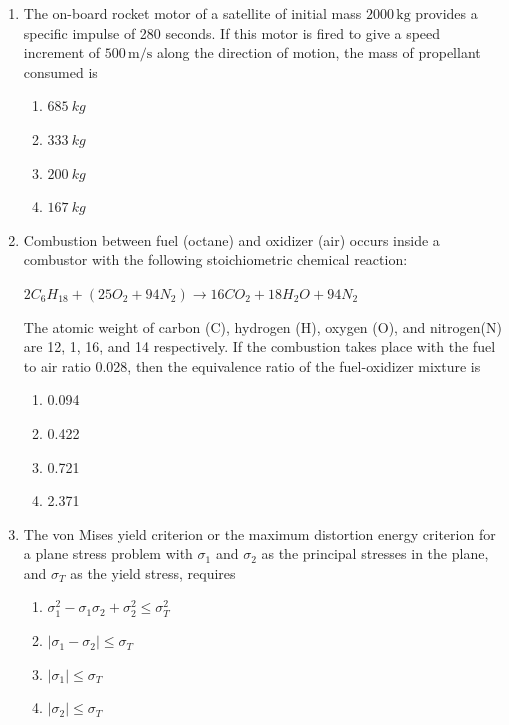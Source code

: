 \documentclass{article}
\begin{document}
\begin{enumerate}
    \item The on-board rocket motor of a satellite of initial mass $2000 \, \mathrm{kg}$ provides a specific impulse of 280 seconds. If this motor is fired to give a speed increment of $500 \, \mathrm{m/s}$ along the direction of motion, the mass of propellant consumed is
    \begin{enumerate}
        \item $685 \ kg$
        \item $333 \ kg$
        \item $200 \ kg$
        \item $167 \ kg$ 
    \end{enumerate}
        

    \item Combustion between fuel (octane) and oxidizer (air) occurs inside a combustor with the following stoichiometric chemical reaction:
    \begin{center}
        $2C_6H_{18} + (25O_2 + 94N_2) \longrightarrow 16CO_2 + 18H_2O + 94N_2$
    \end{center}
    The atomic weight of carbon (C), hydrogen (H), oxygen (O), and nitrogen(N) are 12, 1, 16, and 14 respectively. If the combustion takes place with the fuel to air ratio 0.028, then the equivalence ratio of the  fuel-oxidizer mixture is
    \begin{multicols}{4}
    \begin{enumerate}
        \item 0.094
        \item 0.422
        \item 0.721
        \item 2.371 
    \end{enumerate}
    \end{multicols}
        

    \item The von Mises yield criterion or the maximum distortion energy criterion for a plane stress problem with $\sigma_1$ and $\sigma_2$ as the principal stresses in the plane, and $\sigma_T$ as the yield stress, requires
    \begin{enumerate}
        \item $\sigma_1^2 - \sigma_1 \sigma_2 + \sigma_2^2 \leq \sigma_T^2$
        \item $|\sigma_1 - \sigma_2| \leq \sigma_T$
        \item $|\sigma_1| \leq \sigma_T$
        \item $|\sigma_2| \leq \sigma_T$
    \end{enumerate}
        


\end{enumerate}
\end{document}
